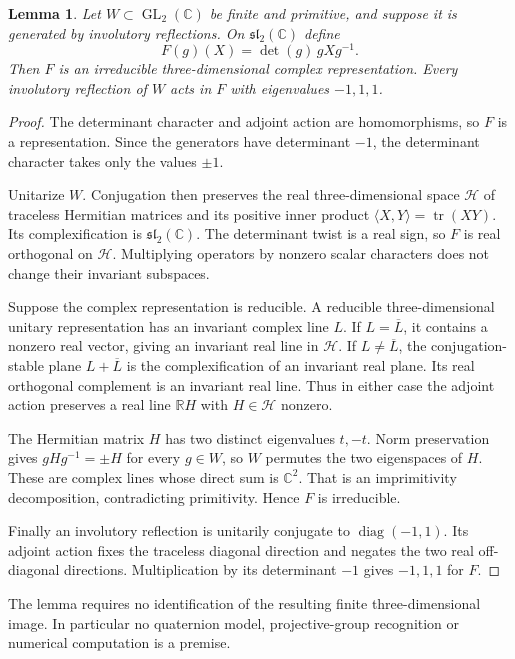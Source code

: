 \documentclass[11pt]{article}
\newtheorem{lemma}[theorem]{Lemma}
\newcommand{\C}{\mathbb C}
\newcommand{\GL}{\operatorname{GL}}
\begin{document}
\begin{lemma}\label{lem:adjoint}
Let $W\subset\GL_2(\C)$ be finite and primitive, and suppose it is
generated by involutory reflections. On $\mathfrak{sl}_2(\C)$ define
\[
                     F(g)(X)=\det(g)\,gXg^{-1}.
\]
Then $F$ is an irreducible three-dimensional complex representation.
Every involutory reflection of $W$ acts in $F$ with eigenvalues
$-1,1,1$.
\end{lemma}
\begin{proof}
The determinant character and adjoint action are homomorphisms, so
$F$ is a representation. Since the generators have determinant
$-1$, the determinant character takes only the values $\pm1$.

Unitarize $W$. Conjugation then preserves the real three-dimensional
space $\mathcal H$ of traceless Hermitian matrices and its positive
inner product $\langle X,Y\rangle=\operatorname{tr}(XY)$.
Its complexification is $\mathfrak{sl}_2(\C)$.
The determinant twist is a real sign, so $F$ is real orthogonal on
$\mathcal H$. Multiplying operators by nonzero scalar characters
does not change their invariant subspaces.

Suppose the complex representation is reducible. A reducible
three-dimensional unitary representation has an invariant complex
line $L$. If $L=\overline L$, it contains a nonzero real vector,
giving an invariant real line in $\mathcal H$.
If $L\ne\overline L$, the conjugation-stable plane
$L+\overline L$ is the complexification of an invariant real
plane. Its real orthogonal complement is an invariant real line.
Thus in either case the adjoint action preserves a real line
$\mathbb R H$ with $H\in\mathcal H$ nonzero.

The Hermitian matrix $H$ has two distinct eigenvalues $t,-t$.
Norm preservation gives $gHg^{-1}=\pm H$ for every $g\in W$,
so $W$ permutes the two eigenspaces of $H$.
These are complex lines whose direct sum is $\C^2$.
That is an imprimitivity decomposition, contradicting primitivity.
Hence $F$ is irreducible.

Finally an involutory reflection is unitarily conjugate to
$\operatorname{diag}(-1,1)$. Its adjoint action fixes the traceless
diagonal direction and negates the two real off-diagonal
directions. Multiplication by its determinant $-1$ gives
$-1,1,1$ for $F$.
\end{proof}

The lemma requires no identification of the resulting finite
three-dimensional image. In particular no quaternion model,
projective-group recognition or numerical computation is a premise.
\end{document}
